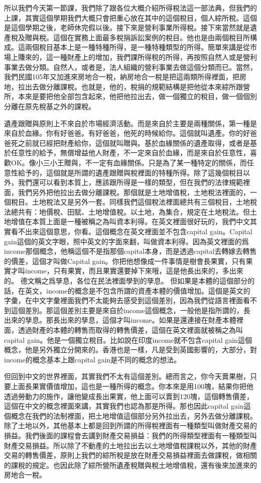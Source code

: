 \documentclass[]{ctexbook}
\begin{document}
所以我們今天第一節課，我們除了跟各位大概介紹所得稅法這一部法典，但我們的上課，其實這個學期我們大概只會把重心放在其中的這個稅目，個人綜所稅。這個是這個學期之後，老師休完假以後。接下來是營利事業所得稅。接下來當然就是遺產稅及贈與稅。這個在實務上面最多稅捐訴訟案例的稅目。他也是由兩個稅目所構成。這兩個稅目基本上是一種特種所得，是一種特種類型的所得。簡單來講是從市場上賺來的，這一種財產上的增加，我們課所得稅的所得，再按照自然人或是營利事業去做分類。自然人，或者是，法人組織的營利事業去做這個分類而已。當然，我們民國105年又加進來房地合一稅，納房地合一稅是把這兩類所得裡面，把房地，拉出去做分離課稅。也就是，他的，稅捐的規範結構是把他從本來綜所跟營所，本來是要把他全部包含起來，他把他拉出去，做一個獨立的稅目，做一個個別分離在原先稅基之外的課稅。

遺產跟贈與原則上不來自於市場經濟活動。而是來自於主要是兩種關係，第一種是來自於血緣。你有好爸爸。有好爸爸，他死的時候給你。這個就叫遺產。你的好爸爸死之前就已經把財產給你，這個就叫贈與。基於血緣關係的遺產取得，或者是基於任意性的給予，無償增益他人財產，不一定來自於血緣，而是來自於任意性，喜歡OK。像小三小王贈與，不一定有血緣關係。只是為了某一種特定的關係，而任意性給予的，這個就是所謂的遺產跟贈與稅裡面的特種所得。除了這幾個稅目以外，我們還可以看到本質上，應該跟所得是一樣的類型，但在我們的法律規範裡面，我們另外把他拉出去做分離課稅。那個就是土地增值稅，土地稅法裡面的，一個稅目。土地稅法又是另外一套。同樣我們這個稅法裡面總共有三個稅目，土地稅法總共有：地價稅、田賦、土地增值稅。以土地，為集合，規定在土地稅法。但土地增值在本質上面是一種被稱之為叫資本利得。在英文裡面很好玩的，我們中文其實看不出來這個意思，你看。這個概念在英文裡面並不包含capital gain。Capital gain這個的英文字眼，照中英文的字面來翻，叫做資本利得。因為英文裡面的爲income那個概念，他稱這個不是指那個capital本身，而是透過capital去轉嫁去轉售的價差，這個才叫做Capital gain。你把他想像成一件事情是樹會長果實，只有果實才叫income，只有果實，而且果實還要掉下來哦，這是他長出來的，多出來的。
德文稱之爲孳息，各位在民法裡面學到的孳息。
但如果是本體的這個部分的話，在英文，income的概念是不包含所謂的資產本體的價值增加。這個是英文的字彙，在中文字彙裡面我們不太能夠去感受到這個差別，因為我們從語言裡面看不到這個差別。那這個差別主要是來自於income這個概念，一般他是指所謂的，長出來的孳息。那長出來的孳息，這個才叫income。如果是還連接在財產本體裡面，透過財產的本體的轉售而取得的轉售價差，這個在英文裡面就被稱之為叫capital gain。他是一個獨立稅目。比如說在印度income就不包含capital gain這個概念，他是另外獨立分開來的。香港也是一樣，凡是受到英國影響的，大部分，對income的概念基本上跟capital gain是不同的概念的想法。

但回到中文的世界裡面，其實我們不太有這個差別。總而言之，你今天賣果樹，只要上面長果實價值增加，這也是一種所得的概念。你本來是用100塊，結果你把他透過勞動力的施作，讓他變成長出果實，他上面可以賣到120塊，這個轉售價差，這個在中文的概念裡面來講，其實我們也認為那是所得。那也因此capital gain這個概念在我們的法制裡面，把土地增值這個部分另外拉出去，另外去做分離課稅。除了土地以外，其他基本上都是回到所謂的所得稅裡面有一種類型叫做財產交易的損益。我們後面的課程會去講到財產交易損益：我們的所得類型裡面有一種類型叫財產交易損益。所以除了不動產的土地拉出去以土地增值稅課稅以外，其他的財產交易的轉售價差，原則上我們的綜所稅是放在財產交易損益裡面去做課稅，做相關的課稅的規定。也因此除了綜所營所遺產稅贈與稅土地增值稅，還有後來加進來的房地合一稅。
\end{document}

